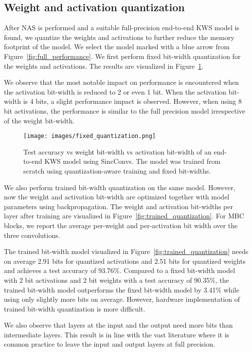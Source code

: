 \documentclass[a4paper]{article}
\begin{document}
\subsection{Weight and activation quantization}
\label{sec:quantization_exp}
After NAS is performed and a suitable full-precision end-to-end KWS model is found, we quantize the weights and activations to further reduce the memory footprint of the model. We select the model marked with a blue arrow from Figure~\ref{fig:full_performance}. We first perform fixed bit-width quantization for the weights and activations. The results are visualized in Figure~\ref{fig:fixed_quantization}.

We observe that the most notable impact on performance is encountered when the activation bit-width is reduced to 2 or even 1 bit. When the activation bit-width is 4 bits, a slight performance impact is observed. However, when using 8 bit activations, the performance is similar to the full precision model irrespective of the weight bit-width. 

\begin{figure}[t]
	\centerline{\texttt{[image: images/fixed\_quantization.png]}}
	\caption{Test accuracy vs weight bit-width vs activation bit-width of an end-to-end KWS model using SincConvs. The model was trained from scratch using quantization-aware training and fixed bit-widths.}
	\label{fig:fixed_quantization}
\end{figure}

We also perform trained bit-width quantization on the same model. However, now the weight and activation bit-width are optimized together with model parameters using backpropagation. The weight and activation bit-widths per layer after training are visualized in Figure~\ref{fig:trained_quantization}. For MBC blocks, we report the average per-weight and per-activation bit width over the three convolutions.

The trained bit-width model visualized in Figure~\ref{fig:trained_quantization} needs on average 2.91 bits for quantized activations and 2.51 bits for quantized weights and achieves a test accuracy of 93.76\%. Compared to a fixed bit-width model with 2 bit activations and 2 bit weights with a test accuracy of 90.35\%, the trained bit-width model outperforms the fixed bit-width model by 3.41\% while using only slightly more bits on average. However, hardware implementation of trained bit-width quantization is more difficult.

We also observe that layers at the input and the output need more bits than intermediate layers. This result is in line with the vast literature where it is common practice to leave the input and output layers at full precision.
\end{document}
